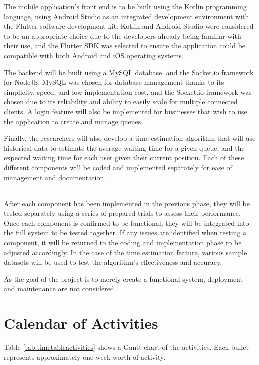 The mobile application’s front end is to be built using the Kotlin programming language, using Android Studio as an integrated development environment with the Flutter software development kit. Kotlin and Android Studio were considered to be an appropriate choice due to the developers already being familiar with their use, and the Flutter SDK was selected to ensure the application could be compatible with both Android and iOS operating systems.

The backend will be built using a MySQL database, and the Socket.io framework for NodeJS. MySQL was chosen for database management thanks to its simplicity, speed, and low implementation cost, and the Socket.io framework was chosen due to its reliability and ability to easily scale for multiple connected clients.
A login feature will also be implemented for businesses that wish to use the application to create and manage queues.

Finally, the researchers will also develop a time estimation algorithm that will use historical data to estimate the average waiting time for a given queue, and the expected waiting time for each user given their current position.
Each of these different components will be coded and implemented separately for ease of management and documentation.

 \\
After each component has been implemented in the previous phase, they will be tested separately using a series of prepared trials to assess their performance. Once each component is confirmed to be functional, they will be integrated into the full system to be tested together. If any issues are identified when testing a component, it will be returned to the coding and implementation phase to be adjusted accordingly.
In the case of the time estimation feature, various sample datasets will be used to test the algorithm’s effectiveness and accuracy.

As the goal of the project is to merely create a functional system, deployment and maintenance are not considered.


\section{Calendar of Activities}

Table \ref{tab:timetableactivities} shows a Gantt chart of the activities.  Each bullet represents approximately
one week worth of activity.

